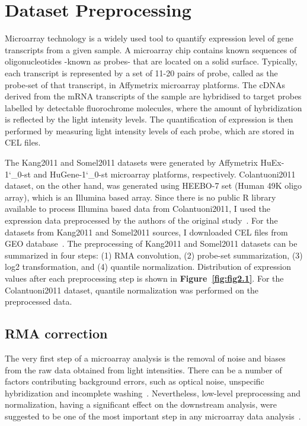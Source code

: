 \section{Dataset Preprocessing}
Microarray technology is a widely used tool to quantify expression level of gene transcripts from a given sample. 
A microarray chip contains known sequences of oligonucleotides -known as probes- that are located on a solid surface.
Typically, each transcript is represented by a set of 11-20 pairs of probe, called as the probe-set of that transcript, in Affymetrix microarray platforms.
The cDNAs derived from the mRNA transcripts of the sample are hybridised to target probes labelled by detectable fluorochrome molecules, 
where the amount of hybridization is reflected by the light intensity levels.
The quantification of expression is then performed by measuring light intensity levels of each probe, which are stored in CEL files.

The Kang2011 and Somel2011 datasets were generated by Affymetrix HuEx-1\char`_0-st and HuGene-1\char`_0-st microarray platforms, respectively. 
Colantuoni2011 dataset, on the other hand, was generated using HEEBO-7 set (Human 49K oligo array), which is an Illumina based array. 
Since there is no public R library available to process Illumina based data from Colantuoni2011, 
I used the expression data preprocessed by the authors of the original study~\cite{Colantuoni2011}. 
For the datasets from Kang2011 and Somel2011 sources, I downloaded CEL files from GEO database~\cite{Barrett2013}. 
The preprocessing of Kang2011 and Somel2011 datasets can be summarized in four steps: (1) RMA convolution, (2) probe-set summarization,
(3) log2 transformation, and (4) quantile normalization. 
Distribution of expression values after each preprocessing step is shown in \textbf{Figure~\ref{fig:fig2.1}}.
For the Colantuoni2011 dataset, quantile normalization was performed on the preprocessed data.

\subsection{RMA correction}
The very first step of a microarray analysis is the removal of noise and biases from the raw data obtained from light intensities.
There can be a number of factors contributing background errors, such as optical noise, unspecific hybridization and incomplete washing~\cite{Bengtsson2006}. 
Nevertheless, low-level preprocessing and normalization, having a significant effect on the downstream analysis, 
were suggested to be one of the most important step in any microarray data analysis~\cite{Bengtsson2006}.

